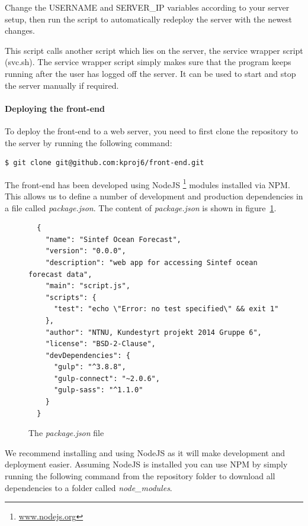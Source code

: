 \documentclass[11pt,a4paper,titlepage,oneside]{report}
\begin{document}
Change the USERNAME and SERVER\_IP variables according to your server setup, then run the script to automatically redeploy the server with the newest changes.

This script calls another script which lies on the server, the service wrapper script (svc.sh).
The service wrapper script simply makes sure that the program keeps running after the user has logged off the server. It can be used to start and stop the server manually if required.

\paragraph{Deploying the front-end}
To deploy the \gls{front-end} to a web server, you need to first clone the repository to the server by running the following command:

\begin{lstlisting}
$ git clone git@github.com:kproj6/front-end.git
\end{lstlisting}

The front-end has been developed using NodeJS \footnote{\url{www.nodejs.org}} modules installed via \gls{NPM}. This allows us to define a number of development and production dependencies in a file called \emph{package.json}. The content of \emph{package.json} is shown in figure~\ref{fig:packagejson}.

\begin{figure}[!htb]
  \begin{lstlisting}
  {
    "name": "Sintef Ocean Forecast",
    "version": "0.0.0",
    "description": "web app for accessing Sintef ocean forecast data",
    "main": "script.js",
    "scripts": {
      "test": "echo \"Error: no test specified\" && exit 1"
    },
    "author": "NTNU, Kundestyrt projekt 2014 Gruppe 6",
    "license": "BSD-2-Clause",
    "devDependencies": {
      "gulp": "^3.8.8",
      "gulp-connect": "~2.0.6",
      "gulp-sass": "^1.1.0"
    }
  }
  \end{lstlisting}
  \caption{The \emph{package.json} file}
  \label{fig:packagejson}
\end{figure}

\newpage

We recommend installing and using NodeJS as it will make development and deployment easier. Assuming NodeJS is installed you can use \gls{NPM} by simply running the following command from the repository folder to download all dependencies to a folder called \emph{node\_modules}.
\end{document}
